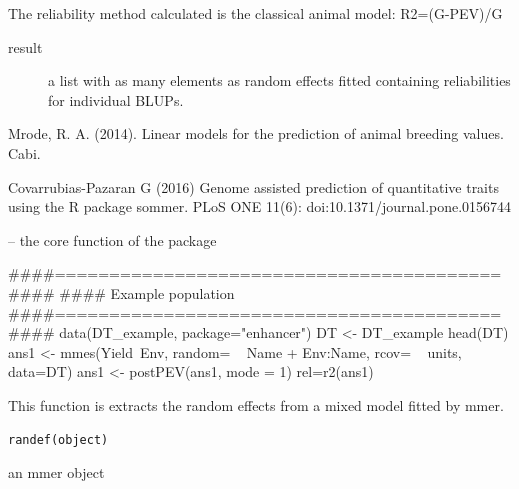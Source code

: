\documentclass[a4paper]{book}
\begin{document}
%
\begin{Details}\relax

The reliability method calculated is the classical animal model: R2=(G-PEV)/G

\end{Details}
%
\begin{Value}
\begin{description}

\item[result] a list with as many elements as random effects fitted containing reliabilities for individual BLUPs.

\end{description}

\end{Value}
%
\begin{References}\relax

Mrode, R. A. (2014). Linear models for the prediction of animal breeding values. Cabi.

Covarrubias-Pazaran G (2016) Genome assisted prediction of quantitative traits using the R package sommer. PLoS ONE 11(6): doi:10.1371/journal.pone.0156744

\end{References}
%
\begin{SeeAlso}\relax
{} -- the core function of the package 
\end{SeeAlso}
%
\begin{Examples}
\begin{ExampleCode}
####=========================================####
#### Example population
####=========================================####
data(DT_example, package="enhancer")
DT <- DT_example
head(DT)
ans1 <- mmes(Yield~Env, 
             random= ~ Name + Env:Name,
             rcov= ~ units,
             data=DT)
ans1 <- postPEV(ans1, mode = 1)
rel=r2(ans1)
\end{ExampleCode}
\end{Examples}
%
\begin{Description}\relax
This function is extracts the random effects from a mixed model fitted by mmer.
\end{Description}
%
\begin{Usage}
\begin{verbatim}
randef(object)
\end{verbatim}
\end{Usage}
%
\begin{Arguments}
\begin{ldescription}
\item[\code{object}] an mmer object
\end{ldescription}
\end{Arguments}
\end{document}
